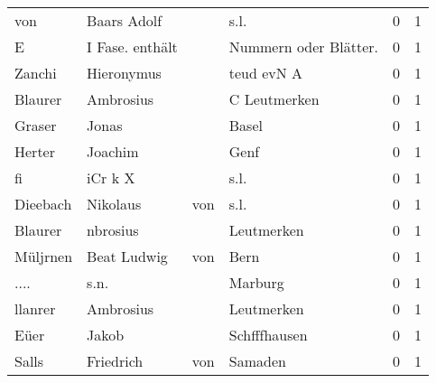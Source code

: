 \begin{center}
\begin{tiny}
\begin{longtabu}{llllrr}
                      von &                        Baars Adolf &             &                                        s.l. &          0 &         1 \\
                        E &                    I Fase. enthält &             &                      Nummern oder Blätter.  &          0 &         1 \\
                   Zanchi &                         Hieronymus &             &                                  teud evN A &          0 &         1 \\
                  Blaurer &                          Ambrosius &             &                                C Leutmerken &          0 &         1 \\
                   Graser &                              Jonas &             &                                       Basel &          0 &         1 \\
                   Herter &                            Joachim &             &                                        Genf &          0 &         1 \\
                       fi &                            iCr k X &             &                                        s.l. &          0 &         1 \\
                 Dieebach &                           Nikolaus &         von &                                        s.l. &          0 &         1 \\
                  Blaurer &                           nbrosius &             &                                  Leutmerken &          0 &         1 \\
                 Müljrnen &                        Beat Ludwig &         von &                                        Bern &          0 &         1 \\
                     .... &                               s.n. &             &                                     Marburg &          0 &         1 \\
                  llanrer &                          Ambrosius &             &                                  Leutmerken &          0 &         1 \\
                     Eüer &                              Jakob &             &                                Schfffhausen &          0 &         1 \\
                    Salls &                          Friedrich &         von &                                     Samaden &          0 &         1 \\

\end{longtabu}
\end{tiny}
\end{center}
